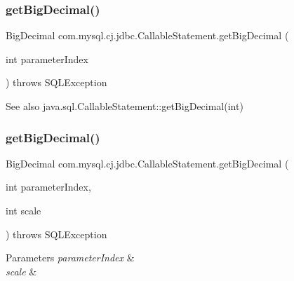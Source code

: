 \subsubsection{\texorpdfstring{get\+Big\+Decimal()}{getBigDecimal()}\hspace{0.1cm}{\footnotesize\ttfamily [1/3]}}
{\footnotesize\ttfamily Big\+Decimal com.\+mysql.\+cj.\+jdbc.\+Callable\+Statement.\+get\+Big\+Decimal (\begin{DoxyParamCaption}\item[{int}]{parameter\+Index }\end{DoxyParamCaption}) throws S\+Q\+L\+Exception}

\begin{DoxySeeAlso}{See also}
java.\+sql.\+Callable\+Statement\+::get\+Big\+Decimal(int) 
\end{DoxySeeAlso}
\mbox{\label{classcom_1_1mysql_1_1cj_1_1jdbc_1_1_callable_statement_aa8343c70b7c58a64f062ee4d0fef0981}} 
\subsubsection{\texorpdfstring{get\+Big\+Decimal()}{getBigDecimal()}\hspace{0.1cm}{\footnotesize\ttfamily [2/3]}}
{\footnotesize\ttfamily Big\+Decimal com.\+mysql.\+cj.\+jdbc.\+Callable\+Statement.\+get\+Big\+Decimal (\begin{DoxyParamCaption}\item[{int}]{parameter\+Index,  }\item[{int}]{scale }\end{DoxyParamCaption}) throws S\+Q\+L\+Exception}


\begin{DoxyParams}{Parameters}
{\em parameter\+Index} & \\
\hline
{\em scale} & \\
\hline
\end{DoxyParams}

